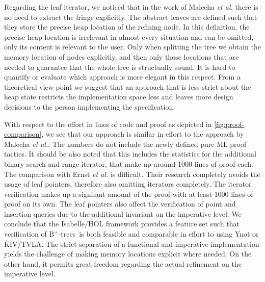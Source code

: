 \documentclass[a4paper,UKenglish,cleveref, cref, thm-restate]{lipics-v2021}
\newcommand{\btrees}{B$^+$-trees}
\begin{document}
Regarding the leaf iterator, we noticed that in the work of Malecha \emph{et al.}
there is no need to extract the fringe explicitly.
The abstract leaves are defined such that they store the precise heap location of the refining node.
In this definition, the precise heap location
is irrelevant in almost every situation and can be omitted,
only its content is relevant to the user.
Only when splitting the tree we obtain the memory location
of nodes explicitly, and then only those locations that are needed to guarantee
that the whole tree is structually sound.
It is hard to quantify or evaluate which approach
is more elegant in this respect.
From a theoretical view point
we suggest that an approach that is less strict
about the heap state restricts the implementation space less
and leaves more design decisions to the person implementing the specification.


With respect to the effort in lines of code and proof
as depicted in \cref{fig:proof-comparison}, we see
that our approach is similar in effort to the approach by Malecha \emph{et al.}.
The numbers do not include the newly defined pure ML proof tactics.
It should be also noted that this includes the statistics
for the additional binary search and range iterator,
that make up around 1000 lines of proof each.
The comparison with Ernst \emph{et al.} is difficult.
Their research completely avoids the usage of leaf pointers,
therefore also omitting iterators completely.
The iterator verification makes up a signifant amount of the proof
with at least 1000 lines of proof on its own.
The leaf pointers also affect the verification of point and insertion queries
due to the additional invariant on the imperative level.
We conclude that the Isabelle/HOL framework
provides a feature set
such that verification of \btrees\ is both feasible
and comparable in effort to using Ynot or KIV/TVLA.
The strict separation of a functional and imperative
implementation yields the challenge
of making memory locations explicit where needed.
On the other hand, it permits great freedom
regarding the actual refinement on the imperative level.
\end{document}
